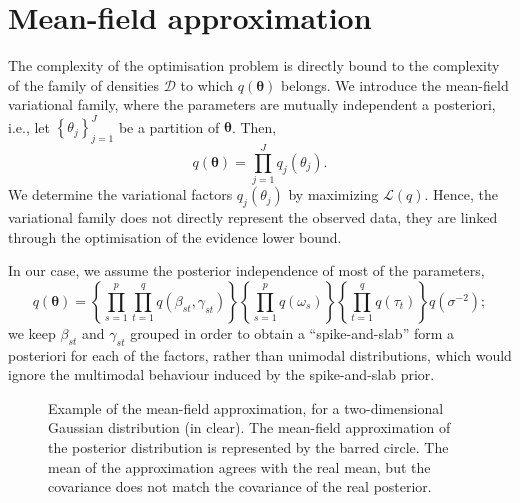 \documentclass[a4paper, 11pt]{report}
\numberwithin{equation}{chapter}
\begin{document}
\section{Mean-field approximation}
The complexity of the optimisation problem is directly bound to the complexity of the family of densities $\mathcal{D}$ to which $q(\boldsymbol{\theta})$ belongs. We introduce the mean-field variational family, where the parameters are mutually independent a posteriori, i.e., let $\left\lbrace \theta_j\right\rbrace_{j=1}^J$ be a partition of $\boldsymbol{\theta}$. Then,
\begin{equation*}
q(\boldsymbol{\theta}) = \prod_{j=1}^J q_j(\theta_j).
\end{equation*}
We determine the variational factors $q_j(\theta_j)$ by maximizing $\mathcal{L}(q)$. Hence, the variational family does not directly represent the observed data, they are linked through the optimisation of the evidence lower bound.

In our case, we assume the posterior independence of most of the parameters,
\begin{equation*}
q(\boldsymbol{\theta}) =\left\lbrace\prod_{s=1}^p \prod_{t=1}^q q(\beta_{st}, \gamma_{st})\right\rbrace \left\lbrace\prod_{s=1}^p  q(\omega_s)\right\rbrace \left\lbrace\prod_{t=1}^q q(\tau_t)\right\rbrace q(\sigma^{-2});
\end{equation*}
we keep $\beta_{st}$ and $\gamma_{st}$ grouped in order to obtain a ``spike-and-slab'' form a posteriori for each of the factors, rather than unimodal distributions, which would ignore the multimodal behaviour induced by the spike-and-slab prior.

\begin{figure}[t]
\centering
{}
\caption{\label{fig:mean_field}Example of the mean-field approximation, for a two-dimensional Gaussian distribution (in clear). The mean-field approximation of the posterior distribution is represented by the barred circle. The mean of the approximation agrees with the real mean, but the covariance does not match the covariance of the real posterior.}
\end{figure}
\end{document}
